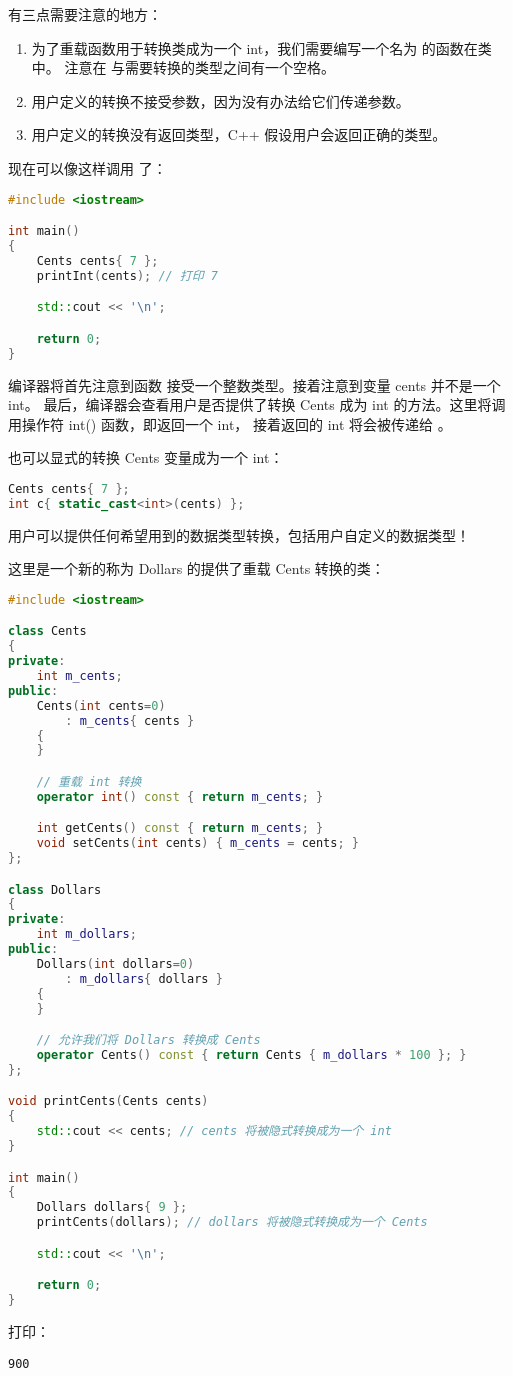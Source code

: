 \documentclass[../../LearnCpp.tex]{subfiles}
\begin{document}
有三点需要注意的地方：

\begin{enumerate}
  \item 为了重载函数用于转换类成为一个 int，我们需要编写一个名为  的函数在类中。
        注意在  与需要转换的类型之间有一个空格。
  \item 用户定义的转换不接受参数，因为没有办法给它们传递参数。
  \item 用户定义的转换没有返回类型，C++ 假设用户会返回正确的类型。
\end{enumerate}

现在可以像这样调用  了：

\begin{lstlisting}[language=C++]
#include <iostream>

int main()
{
    Cents cents{ 7 };
    printInt(cents); // 打印 7

    std::cout << '\n';

    return 0;
}
\end{lstlisting}

编译器将首先注意到函数  接受一个整数类型。接着注意到变量 cents 并不是一个 int。
最后，编译器会查看用户是否提供了转换 Cents 成为 int 的方法。这里将调用操作符 int() 函数，即返回一个 int，
接着返回的 int 将会被传递给 。

也可以显式的转换 Cents 变量成为一个 int：

\begin{lstlisting}[language=C++]
Cents cents{ 7 };
int c{ static_cast<int>(cents) };
\end{lstlisting}

用户可以提供任何希望用到的数据类型转换，包括用户自定义的数据类型！

这里是一个新的称为 Dollars 的提供了重载 Cents 转换的类：

\begin{lstlisting}[language=C++]
#include <iostream>

class Cents
{
private:
    int m_cents;
public:
    Cents(int cents=0)
        : m_cents{ cents }
    {
    }

    // 重载 int 转换
    operator int() const { return m_cents; }

    int getCents() const { return m_cents; }
    void setCents(int cents) { m_cents = cents; }
};

class Dollars
{
private:
    int m_dollars;
public:
    Dollars(int dollars=0)
        : m_dollars{ dollars }
    {
    }

    // 允许我们将 Dollars 转换成 Cents
    operator Cents() const { return Cents { m_dollars * 100 }; }
};

void printCents(Cents cents)
{
    std::cout << cents; // cents 将被隐式转换成为一个 int
}

int main()
{
    Dollars dollars{ 9 };
    printCents(dollars); // dollars 将被隐式转换成为一个 Cents

    std::cout << '\n';

    return 0;
}
\end{lstlisting}

打印：

\begin{lstlisting}
900
\end{lstlisting}
\end{document}
